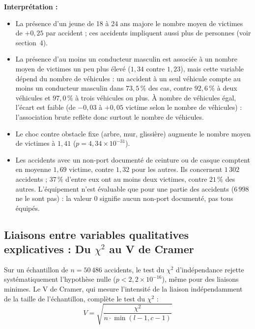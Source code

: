 \documentclass[11pt,a4paper]{article}
\begin{document}
\noindent\textbf{Interprétation :}
\begin{itemize}
    \item La présence d'un jeune de 18 à 24 ans majore le nombre moyen de victimes de $+0{,}25$ par accident ; ces accidents impliquent aussi plus de personnes (voir section~4).
    \item La présence d'au moins un conducteur masculin est associée à un nombre moyen de victimes un peu plus élevé ($1{,}34$ contre $1{,}23$), mais cette variable dépend du nombre de véhicules : un accident à un seul véhicule compte au moins un conducteur masculin dans $73{,}5\,\%$ des cas, contre $92{,}6\,\%$ à deux véhicules et $97{,}0\,\%$ à trois véhicules ou plus. À nombre de véhicules égal, l'écart est faible (de $-0{,}03$ à $+0{,}05$ victime selon le nombre de véhicules) : l'association brute reflète donc surtout le nombre de véhicules.
    \item Le choc contre obstacle fixe (arbre, mur, glissière) augmente le nombre moyen de victimes à $1{,}41$ ($p = 4{,}34 \times 10^{-31}$).
       \item Les accidents avec un non-port documenté de ceinture ou de casque comptent en moyenne $1{,}69$ victime, contre $1{,}32$ pour les autres. Ils concernent $1\,302$ accidents ; $37\,\%$ d'entre eux ont au moins deux victimes, contre $21\,\%$ des autres. L'équipement n'est évaluable que pour une partie des accidents ($6\,998$ ne le sont pas) : la valeur 0 signifie \og aucun non-port documenté\fg{}, pas \og tous équipés\fg{}.
\end{itemize}



\subsection{Liaisons entre variables qualitatives explicatives : Du $\chi^2$ au V de Cramer}

Sur un échantillon de $n = 50\,486$ accidents, le test du $\chi^2$ d'indépendance rejette systématiquement l'hypothèse nulle ($p < 2{,}2 \times 10^{-16}$), même pour des liaisons minimes. Le V de Cramer, qui mesure l'intensité de la liaison indépendamment de la taille de l'échantillon, complète le test du $\chi^2$ :
\[
V = \sqrt{\frac{\chi^2}{n \cdot \min(l-1, c-1)}}
\]
\end{document}
